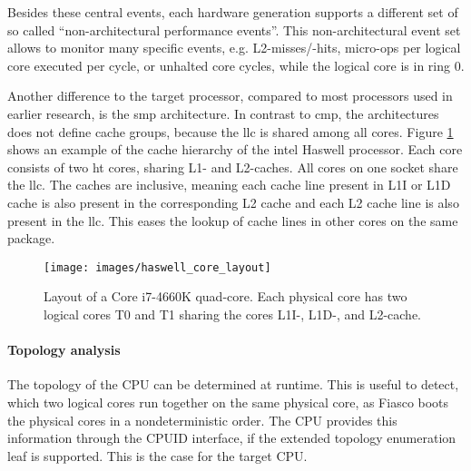Besides these central events, each hardware generation supports a different set
of so called ``non-architectural performance events''.
This non-architectural event set allows to monitor many specific events, e.g.
L2-misses/-hits, micro-ops per logical core executed per cycle, or unhalted
core cycles, while the logical core is in ring 0.

Another difference to the target processor, compared to most processors used in
earlier research, is the \gls{smp} architecture.
In contrast to \gls{cmp}, the architectures does not define cache groups,
because the \gls{llc} is shared among all cores.
Figure \ref{state:fig:core_layout} shows an example of the cache hierarchy of
the \gls{intel} Haswell processor.
Each core consists of two \gls{ht} cores, sharing L1- and L2-caches.
All cores on one socket share the \gls{llc}.
The caches are inclusive, meaning each cache line present in L1I or L1D
cache is also present in the corresponding L2 cache and each L2 cache line is
also present in the \gls{llc}.
This eases the lookup of cache lines in other cores on the same package.


\begin{figure}[h!]
  \centering
  \texttt{[image: images/haswell\_core\_layout]}
  \caption{Layout of a Core i7-4660K quad-core.
    Each physical core has two logical cores T0 and T1 sharing the cores L1I-,
    L1D-, and L2-cache.}
  \label{state:fig:core_layout}
\end{figure}

\paragraph{Topology analysis}
The topology of the CPU can be determined at runtime.
This is useful to detect, which two logical cores run together on the same
physical core, as Fiasco boots the physical cores in a nondeterministic order.
The CPU provides this information through the CPUID interface, if the
extended topology enumeration leaf is supported. This is the case for the
target CPU.

